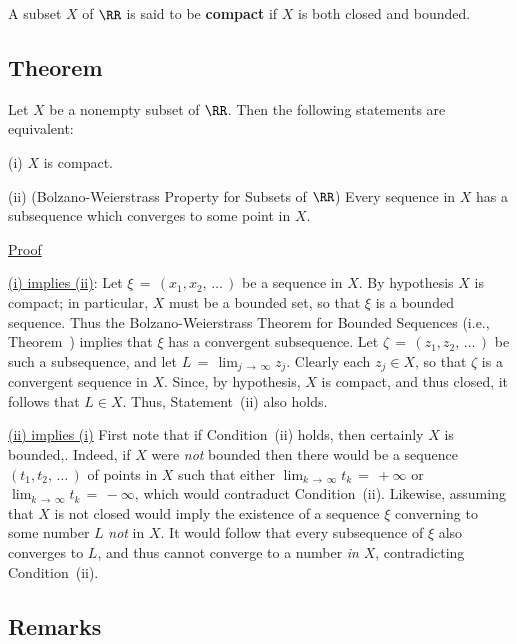 {        A subset $X$ of ${\RR}$ is said to be {\bf compact} if $X$ is both closed and bounded.

\V

                    \subsection{\small{\bf Theorem}}
            \label{ThmC80.100}


        Let $X$ be a nonempty subset of ${\RR}$.
    Then the following statements are equivalent:

        (i) $X$ is compact.

\V

        (ii) (Bolzano-Weierstrass Property for Subsets of ${\RR}$) Every sequence in $X$ has a subsequence which converges to some point in $X$.

\V

        \underline{Proof}

\V

        \underline{(i) implies (ii)}: Let ${\xi} \,=\, (x_{1},x_{2},\,{\ldots}\,)$ be a sequence in $X$.
    By hypothesis $X$ is compact; in particular, $X$ must be a bounded set, so that ${\xi}$ is a bounded sequence.
    Thus the Bolzano-Weierstrass Theorem for Bounded Sequences (i.e., Theorem~) implies that ${\xi}$ has a convergent subsequence.
    Let ${\zeta} \,=\, (z_{1},z_{2},\,{\ldots}\,)$ be such a subsequence, and let $L \,=\, \lim_{j \,{\rightarrow}\, {\infty}} z_{j}$.
    Clearly each $z_{j}{\in}X$, so that ${\zeta}$ is a convergent sequence in $X$.
    Since, by hypothesis, $X$ is compact, and thus closed, it follows that $L{\in}X$. Thus, Statement~(ii) also holds.

\V

        \underline{(ii) implies (i)} First note that if Condition~(ii) holds, then certainly $X$ is bounded,.
    Indeed, if $X$ were {\em not} bounded then there would be a sequence $(t_{1},t_{2},\,{\ldots}\,)$ of points in $X$ such that either $\lim_{k \,{\rightarrow}\, {\infty}} t_{k} \,=\, +{\infty}$ or $\lim_{k \,{\rightarrow}\, {\infty}} t_{k} \,=\, -{\infty}$, which would contraduct Condition~(ii).
    Likewise, assuming that $X$ is not closed would imply the existence of a sequence ${\xi}$ converning to some number $L$ {\em not} in $X$.
    It would follow that every subsequence of ${\xi}$ also converges to $L$, and thus  cannot converge to a number {\em in} $X$, contradicting Condition~(ii).

            \subsection{\small{\bf Remarks}}
            \label{RemrkC80.110}

}
